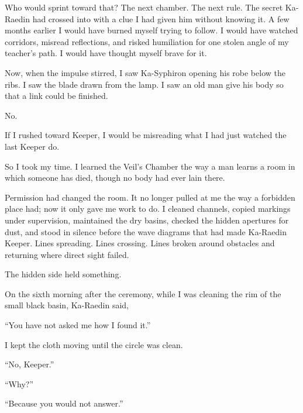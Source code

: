 Who would sprint toward that? The next chamber. The next rule. The secret Ka-Raedin had crossed into with a clue I had given him without knowing it. A few months earlier I would have burned myself trying to follow. I would have watched corridors, misread reflections, and risked humiliation for one stolen angle of my teacher's path. I would have thought myself brave for it.\par

Now, when the impulse stirred, I saw Ka-Syphiron opening his robe below the ribs. I saw the blade drawn from the lamp. I saw an old man give his body so that a link could be finished.\par

No.\par

If I rushed toward Keeper, I would be misreading what I had just watched the last Keeper do.\par

So I took my time. I learned the Veil's Chamber the way a man learns a room in which someone has died, though no body had ever lain there.\par

Permission had changed the room. It no longer pulled at me the way a forbidden place had; now it only gave me work to do. I cleaned channels, copied markings under supervision, maintained the dry basins, checked the hidden apertures for dust, and stood in silence before the wave diagrams that had made Ka-Raedin Keeper. Lines spreading. Lines crossing. Lines broken around obstacles and returning where direct sight failed.\par

The hidden side held something.\par

On the sixth morning after the ceremony, while I was cleaning the rim of the small black basin, Ka-Raedin said,\par

``You have not asked me how I found it.''\par

I kept the cloth moving until the circle was clean.\par

``No, Keeper.''\par

``Why?''\par

``Because you would not answer.''\par

